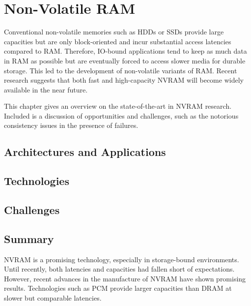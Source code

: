 \chapter{Non-Volatile RAM}
\label{ch:nvram}

Conventional non-volatile memories such as \acp{HDD} or \acp{SSD} provide large
capacities but are only block-oriented and incur substantial access latencies
compared to \ac{RAM}. Therefore, \ac{IO}-bound applications tend to keep as much
data in \ac{RAM} as possible but are eventually forced to access slower media
for durable storage. This led to the development of non-volatile variants of
\ac{RAM}. Recent research suggests that both fast and high-capacity \ac{NVRAM}
will become widely available in the near future.

This chapter gives an overview on the state-of-the-art in \ac{NVRAM} research.
Included is a discussion of opportunities and challenges, such as the notorious
consistency issues in the presence of failures.

\section{Architectures and Applications}
\label{ch:nvram-architectures}


\section{Technologies}
\label{ch:nvram-technologies}


\section{Challenges}
\label{ch:nvram-challenges}


% 

\section{Summary}
\label{ch:nvram-summary}

\ac{NVRAM} is a promising technology, especially in storage-bound environments.
Until recently, both latencies and capacities had fallen short of expectations.
However, recent advances in the manufacture of \ac{NVRAM} have shown promising
results. Technologies such as \ac{PCM} provide larger capacities than \ac{DRAM}
at slower but comparable latencies.

